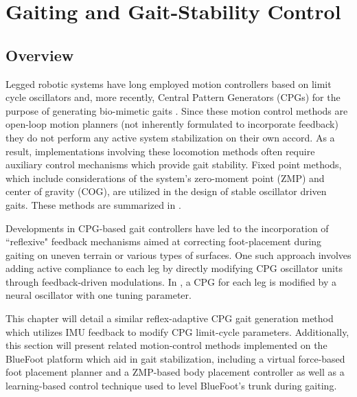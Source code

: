 
\chapter{Gaiting and Gait-Stability Control}
	\label{ch::gait_control}
	

	\section{Overview}

		Legged robotic systems have long employed motion controllers based on limit cycle oscillators and, more recently, Central Pattern Generators (CPGs)  for the purpose of generating bio-mimetic gaits \cite{Matsuoka1985,Collins1993,Endo2004,Righetti2006,Ijspeert2008,Matos2010,Ajallooeian2013,Park2014,Fukuoka2015}. Since these motion control methods are open-loop motion planners (\IE not inherently formulated to incorporate feedback) they do not perform any active system stabilization on their own accord. As a result, implementations involving these  locomotion methods often require auxiliary control mechanisms which provide gait stability. Fixed point methods, which include considerations of the system's zero-moment point (ZMP) and center of gravity (COG), are utilized in the design of stable oscillator driven gaits. These methods are summarized in \cite{Wieber2015}. %

		Developments in CPG-based gait controllers have led to the incorporation of ``reflexive" feedback mechanisms aimed at correcting foot-placement during gaiting on uneven terrain or various types of surfaces. One such approach involves adding active compliance to each leg by directly modifying CPG oscillator units through feedback-driven modulations. In \cite{Fukuoka2003,Endo2004}, a CPG for each leg is modified by a neural oscillator with one tuning parameter. 

		This chapter will detail a similar reflex-adaptive CPG gait generation method which utilizes IMU feedback to modify CPG limit-cycle parameters. Additionally, this section will present related motion-control methods implemented on the BlueFoot platform which aid in gait stabilization, including a virtual force-based foot placement planner and a ZMP-based body placement controller as well as a learning-based control technique used to level BlueFoot's trunk during gaiting.


